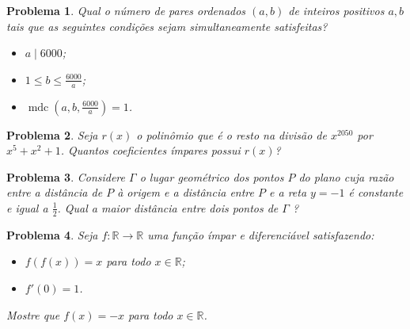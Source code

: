 \documentclass{hipatia}
\newtheorem{problem*}{Problema}
\begin{document}
\begin{problem*}
Qual o número de pares ordenados $(a,b)$ de inteiros positivos $a, b$ tais que as seguintes condições sejam simultaneamente satisfeitas?


\begin{itemize}
    \item [$(i)$]  
    $a\mid 6000$;
    \item [$(ii)$] 
    $1\le b \le \frac{6000}{a}$;
     \item [$(ii)$]
     $\operatorname{mdc}(a, b,\frac{6000}{a}) = 1$.
\end{itemize}
\end{problem*}

\begin{problem*}
Seja $r(x)$ o polinômio que é o resto na divisão de $x^{2050}$ por $x^5 + x^2  +1$.  Quantos coeficientes ímpares possui $r(x)$?
\end{problem*}



\begin{problem*}
Considere $\Gamma$ o lugar geométrico dos pontos $P$ do plano cuja razão entre a distância de $P$ à origem e a distância entre $P$ e a reta $y=-1$ é constante e igual a $\frac{1}{2}$. Qual a maior distância entre dois pontos de $\Gamma$ ? 
	
\end{problem*}


\begin{problem*}
Seja $f : \mathbb{R} \rightarrow \mathbb{R}$ uma função ímpar e diferenciável satisfazendo:

\begin{itemize}
    \item $f(f(x)) = x$ para todo $x \in \mathbb{R}$;
    \item $f'(0) = 1$.
\end{itemize}

\noindent Mostre que $f(x) = -x$ para todo $x \in \mathbb{R}$.
	
\end{problem*}
\end{document}
